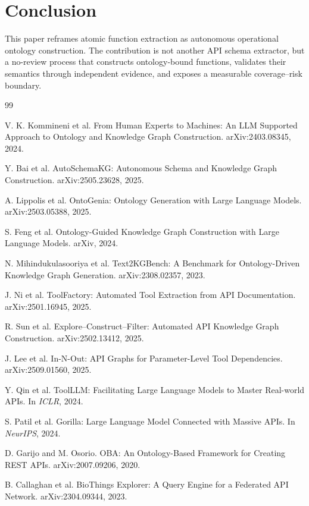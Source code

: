 \documentclass[10pt,twocolumn]{article}
\begin{document}
\section{Conclusion}
This paper reframes atomic function extraction as autonomous operational ontology construction. The contribution is not another API schema extractor, but a no-review process that constructs ontology-bound functions, validates their semantics through independent evidence, and exposes a measurable coverage--risk boundary.

\begin{thebibliography}{99}

V. K. Kommineni et al.
\newblock From Human Experts to Machines: An LLM Supported Approach to Ontology and Knowledge Graph Construction.
\newblock arXiv:2403.08345, 2024.

Y. Bai et al.
\newblock AutoSchemaKG: Autonomous Schema and Knowledge Graph Construction.
\newblock arXiv:2505.23628, 2025.

A. Lippolis et al.
\newblock OntoGenia: Ontology Generation with Large Language Models.
\newblock arXiv:2503.05388, 2025.

S. Feng et al.
\newblock Ontology-Guided Knowledge Graph Construction with Large Language Models.
\newblock arXiv, 2024.

N. Mihindukulasooriya et al.
\newblock Text2KGBench: A Benchmark for Ontology-Driven Knowledge Graph Generation.
\newblock arXiv:2308.02357, 2023.

J. Ni et al.
\newblock ToolFactory: Automated Tool Extraction from API Documentation.
\newblock arXiv:2501.16945, 2025.

R. Sun et al.
\newblock Explore--Construct--Filter: Automated API Knowledge Graph Construction.
\newblock arXiv:2502.13412, 2025.

J. Lee et al.
\newblock In-N-Out: API Graphs for Parameter-Level Tool Dependencies.
\newblock arXiv:2509.01560, 2025.

Y. Qin et al.
\newblock ToolLLM: Facilitating Large Language Models to Master Real-world APIs.
\newblock In \emph{ICLR}, 2024.

S. Patil et al.
\newblock Gorilla: Large Language Model Connected with Massive APIs.
\newblock In \emph{NeurIPS}, 2024.

D. Garijo and M. Osorio.
\newblock OBA: An Ontology-Based Framework for Creating REST APIs.
\newblock arXiv:2007.09206, 2020.

B. Callaghan et al.
\newblock BioThings Explorer: A Query Engine for a Federated API Network.
\newblock arXiv:2304.09344, 2023.

\end{thebibliography}
\end{document}
